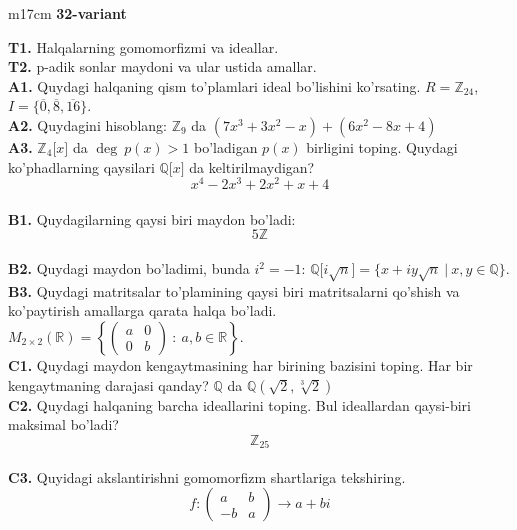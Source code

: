 \documentclass{article}
\begin{document}
\begin{tabular}{m{17cm}}
\textbf{32-variant}
\newline

\textbf{T1.} Halqalarning gomomorfizmi va ideallar. \\
\textbf{T2.} p-adik sonlar maydoni va ular ustida amallar. \\
\textbf{A1.} Quydagi halqaning qism to'plamlari ideal bo'lishini ko'rsating.
\(R = \mathbb{Z}_{24}\), \(I = \{\overline{0},\overline{8},\overline{16}\}\). \\
\textbf{A2.} Quydagini hisoblang:
\(\mathbb{Z}_{9}\) da \(\left( 7x^{3} + 3x^{2} - x \right) + \left( 6x^{2} - 8x + 4 \right)\) \\
\textbf{A3.} \(\mathbb{Z}_{4}\lbrack x\rbrack\) da \(\deg\ p(x) > 1\) bo'ladigan \(p(x)\) birligini toping. Quydagi ko'phadlarning qaysilari \(\mathbb{Q\lbrack}x\rbrack\) da keltirilmaydigan?
\[x^{4} - 2x^{3} + 2x^{2} + x + 4\] \\
\textbf{B1.} Quydagilarning qaysi biri maydon bo'ladi:
\[5\mathbb{Z}\] \\
\textbf{B2.} Quydagi maydon bo'ladimi, bunda \(i^{2} = - 1\):
\(\mathbb{Q\lbrack}i\sqrt{n}\rbrack = \{ x + iy\sqrt{n}\ |\ x,y \in \mathbb{Q\}}\). \\
\textbf{B3.} Quydagi matritsalar to'plamining qaysi biri matritsalarni qo'shish va ko'paytirish amallarga qarata halqa bo'ladi.
\(M_{2 \times 2}\mathbb{(R) =}\left\{ \begin{pmatrix}
a & 0 \\
0 & b
\end{pmatrix}\ :\ a,b \in \mathbb{R} \right\}\). \\
\textbf{C1.} Quydagi maydon kengaytmasining har birining bazisini toping. Har bir kengaytmaning darajasi qanday?
\(\mathbb{Q}\) da \(\mathbb{Q}\left( \sqrt{2},\sqrt[3]{2} \right)\) \\
\textbf{C2.} Quydagi halqaning barcha ideallarini toping. Bul ideallardan qaysi-biri maksimal bo'ladi?
\[\mathbb{Z}_{25}\] \\
\textbf{C3.} Quyidagi akslantirishni gomomorfizm shartlariga tekshiring.
\[f:\begin{pmatrix}
a & b \\
 - b & a
\end{pmatrix} \rightarrow a + bi\] \\

\end{tabular}
\vspace{1cm}
\end{document}
